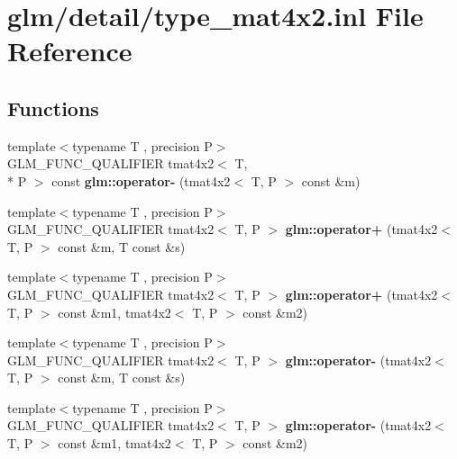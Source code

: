 \hypertarget{type__mat4x2_8inl}{\section{glm/detail/type\-\_\-mat4x2.inl File Reference}
\label{type__mat4x2_8inl}
}
\subsection*{Functions}
\begin{DoxyCompactItemize}
\item 
\hypertarget{namespaceglm_a2e34fe1773cf1e10741d178157dd60cb}{{\footnotesize template$<$typename T , precision P$>$ }\\G\-L\-M\-\_\-\-F\-U\-N\-C\-\_\-\-Q\-U\-A\-L\-I\-F\-I\-E\-R tmat4x2$<$ T, \\*
P $>$ const {\bfseries glm\-::operator-\/} (tmat4x2$<$ T, P $>$ const \&m)}\label{namespaceglm_a2e34fe1773cf1e10741d178157dd60cb}

\item 
\hypertarget{namespaceglm_ac8204cb27263b7da0271586d05a0b4ae}{{\footnotesize template$<$typename T , precision P$>$ }\\G\-L\-M\-\_\-\-F\-U\-N\-C\-\_\-\-Q\-U\-A\-L\-I\-F\-I\-E\-R tmat4x2$<$ T, P $>$ {\bfseries glm\-::operator+} (tmat4x2$<$ T, P $>$ const \&m, T const \&s)}\label{namespaceglm_ac8204cb27263b7da0271586d05a0b4ae}

\item 
\hypertarget{namespaceglm_a6b61c12b4e0452bcbce315424bc3d58a}{{\footnotesize template$<$typename T , precision P$>$ }\\G\-L\-M\-\_\-\-F\-U\-N\-C\-\_\-\-Q\-U\-A\-L\-I\-F\-I\-E\-R tmat4x2$<$ T, P $>$ {\bfseries glm\-::operator+} (tmat4x2$<$ T, P $>$ const \&m1, tmat4x2$<$ T, P $>$ const \&m2)}\label{namespaceglm_a6b61c12b4e0452bcbce315424bc3d58a}

\item 
\hypertarget{namespaceglm_a6410e8fc734abbc0679867a88b5707fb}{{\footnotesize template$<$typename T , precision P$>$ }\\G\-L\-M\-\_\-\-F\-U\-N\-C\-\_\-\-Q\-U\-A\-L\-I\-F\-I\-E\-R tmat4x2$<$ T, P $>$ {\bfseries glm\-::operator-\/} (tmat4x2$<$ T, P $>$ const \&m, T const \&s)}\label{namespaceglm_a6410e8fc734abbc0679867a88b5707fb}

\item 
\hypertarget{namespaceglm_a067e8e20b493b92468065177c1439cad}{{\footnotesize template$<$typename T , precision P$>$ }\\G\-L\-M\-\_\-\-F\-U\-N\-C\-\_\-\-Q\-U\-A\-L\-I\-F\-I\-E\-R tmat4x2$<$ T, P $>$ {\bfseries glm\-::operator-\/} (tmat4x2$<$ T, P $>$ const \&m1, tmat4x2$<$ T, P $>$ const \&m2)}\label{namespaceglm_a067e8e20b493b92468065177c1439cad}


\end{DoxyCompactItemize}
